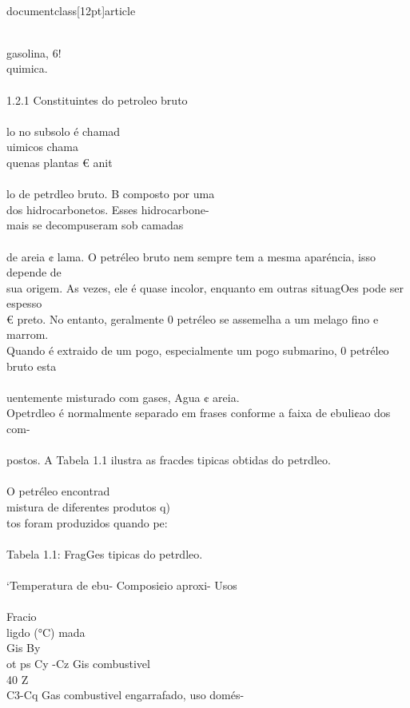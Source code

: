 \\documentclass[12pt]{article}
\begin{document}
{\\
gasolina, 6!\\
quimica.\\
\\
1.2.1 Constituintes do petroleo bruto\\
\\
lo no subsolo é chamad\\
uimicos chama\\
quenas plantas € anit\\
\\
lo de petrdleo bruto. B composto por uma\\
dos hidrocarbonetos. Esses hidrocarbone-\\
mais se decompuseram sob camadas\\
\\
de areia ¢ lama. O petréleo bruto nem sempre tem a mesma aparéncia, isso depende de\\
sua origem. As vezes, ele é quase incolor, enquanto em outras situagOes pode ser espesso\\
€ preto. No entanto, geralmente 0 petréleo se assemelha a um melago fino e marrom.\\
Quando é extraido de um pogo, especialmente um pogo submarino, 0 petréleo bruto esta\\
\\
uentemente misturado com gases, Agua ¢ areia.\\
Opetrdleo é normalmente separado em frases conforme a faixa de ebuli¢ao dos com-\\
\\
postos. A Tabela 1.1 ilustra as fracdes tipicas obtidas do petrdleo.\\
\\
O petréleo encontrad\\
mistura de diferentes produtos q)\\
tos foram produzidos quando pe:\\
\\
Tabela 1.1: FragGes tipicas do petrdleo.\\
\\
‘Temperatura de ebu- Composi¢io aproxi- Usos\\
\\
Fracio\\
ligdo (°C) mada\\
Gis By\\
ot ps Cy -Cz Gis combustivel\\
40 Z\\
C3-Cq Gas combustivel engarrafado, uso domés-\\
}
\end{document}
